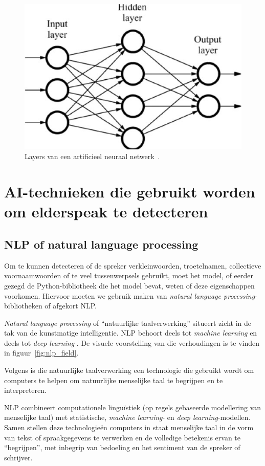 \begin{figure}
    \centering
    \includegraphics[width=.5\textwidth]{./img/layers}
    \caption{\label{fig:layers} Layers van een artificieel neuraal netwerk~\autocite{Lievens2021}.}
\end{figure}


\section{AI-technieken die gebruikt worden om elderspeak te detecteren}

\subsection{NLP of natural language processing}
Om te kunnen detecteren of de spreker verkleinwoorden, troetelnamen, collectieve voornaamwoorden of te veel tussenwerpsels gebruikt, moet het model, of eerder gezegd de Python-bibliotheek die het model bevat, weten of deze eigenschappen voorkomen. Hiervoor moeten we gebruik maken van \textit{natural language processing}-bibliotheken of afgekort NLP.

\textit{Natural language processing} of ``natuurlijke taalverwerking'' situeert zicht in de tak van de kunstmatige intelligentie. NLP behoort deels tot \textit{machine learning} en deels tot \textit{deep learning} \autocite{Kleinings2022}. De visuele voorstelling van die verhoudingen is te vinden in figuur~\ref{fig:nlp_field}.

Volgens \textcite{Kleinings2022} is die natuurlijke taalverwerking een technologie die gebruikt wordt om computers te helpen om natuurlijke menselijke taal te begrijpen en te interpreteren.

NLP combineert computationele linguïstiek (op regels gebaseerde modellering van menselijke taal) met statistische, \textit{machine learning}- en \textit{deep learning}-modellen. Samen stellen deze technologieën computers in staat menselijke taal in de vorm van tekst of spraakgegevens te verwerken en de volledige betekenis ervan te ``begrijpen'', met inbegrip van bedoeling en het sentiment van de spreker of schrijver.~\autocite{IBMCloudEducation2021}

